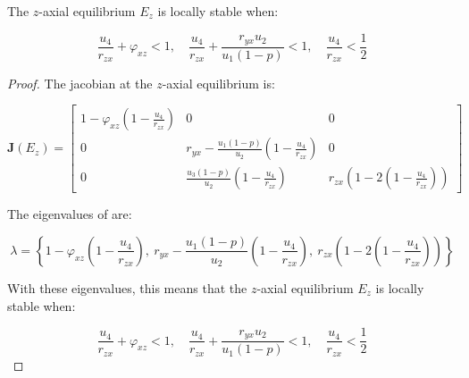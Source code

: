 \begin{theorem}\label{thm:eq-axial-z-stability}
    The $z$-axial equilibrium $E_z$ is locally stable when:

    \begin{equation*}
        \frac{u_4}{r_{zx}}+\varphi_{xz}<1,\quad \frac{u_4}{r_{zx}}+\frac{r_{yx}u_2}{u_1\left(1-p\right)}<1,\quad \frac{u_4}{r_{zx}}<\frac{1}{2}
    \end{equation*}
\end{theorem}
\begin{proof}
    The jacobian at the $z$-axial equilibrium is:

    \begin{equation}\label{matrix:jacobian-axial-z}
        \textbf{J}\left(E_z\right) = \begin{bmatrix}
            1-\varphi_{xz}\left(1-\frac{u_4}{r_{zx}}\right) & 0 & 0\\
            0 & r_{yx}-\frac{u_1\left(1-p\right)}{u_2}\left(1-\frac{u_4}{r_{zx}}\right) & 0\\
            0 & \frac{u_3\left(1-p\right)}{u_2}\left(1-\frac{u_4}{r_{zx}}\right) & r_{zx}\left(1-2\left(1-\frac{u_4}{r_{zx}}\right)\right)
        \end{bmatrix}
    \end{equation}

    The eigenvalues of  are:
    
    \begin{equation*}
        \lambda=\left\{1-\varphi_{xz}\left(1-\frac{u_4}{r_{zx}}\right),\ r_{yx}-\frac{u_1\left(1-p\right)}{u_2}\left(1-\frac{u_4}{r_{zx}}\right),\ r_{zx}\left(1-2\left(1-\frac{u_4}{r_{zx}}\right)\right)\right\}
    \end{equation*}
    
    With these eigenvalues, this means that the $z$-axial equilibrium $E_z$ is locally stable when:

    \begin{equation*}
        \frac{u_4}{r_{zx}}+\varphi_{xz}<1,\quad \frac{u_4}{r_{zx}}+\frac{r_{yx}u_2}{u_1\left(1-p\right)}<1,\quad \frac{u_4}{r_{zx}}<\frac{1}{2}
    \end{equation*}
\end{proof}

